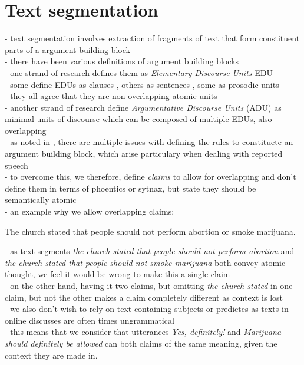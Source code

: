 \section{Text segmentation}

- text segmentation involves extraction of fragments of text that form
constituent parts of a argument building block \\
- there have been various definitions of argument building blocks \\
- one strand of research defines them as \textit{Elementary Discourse Units} EDU \\
- some define EDUs as clauses \citep{winter1982towards, givon1983topic}, 
others as sentences \citep{polanyi1996linguistic}, some as prosodic units
\citep{sacks1978simplest} \\
- they all agree that they are non-overlapping atomic units \\
- another strand of research 
 define \textit{Argumentative Discourse Units} (ADU) 
as minimal units of discourse \citep{peldszus2013argument} 
which can be composed of multiple EDUs, also overlapping \\
- as noted in \citep{lawrence2019argument}, there are multiple issues 
with defining the rules to constituete an argument building block, 
which arise particulary when dealing with reported speech \\
- to overcome this, we therefore, define \textit{claims} to allow
for overlapping and don't define them in terms of phoentics or sytnax, but
state they should be semantically atomic \\ 
- an example why we allow overlapping claims: \\
\begin{mydef}
The church stated that people should not perform abortion or 
smoke marijuana. 
\end{mydef} 
- as text segments \textit{the church stated that people should not perform
abortion} and \textit{the church stated that people should not smoke marijuana}
both convey atomic thought, we feel it would be wrong to make this a single 
claim \\
- on the other hand, having it two claims, but omitting \textit{the church stated}
in one claim, but not the other makes a claim completely different as
context is lost \\
- we also don't wish to rely on text containing subjects or predictes as 
texts in online discusses are often times ungrammatical \\
- this means that we consider that utterances
\textit{Yes, definitely!} and \textit{Marijuana should definitely be allowed}
can both claims of the same meaning, given the context they are made in. \\

